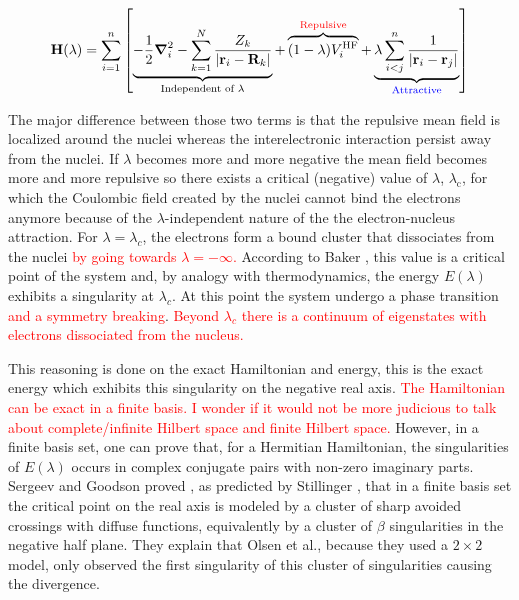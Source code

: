 \documentclass[11pt,a4paper]{article}
\newcommand{\titou}[1]{\textcolor{red}{#1}}
\newcommand{\bH}{\mathbf{H}}
\begin{document}
\begin{equation}\label{eq:HamiltonianStillinger}
    \bH(\lambda)=\sum\limits_{i=1}^{n}\left[ \underbrace{-\frac{1}{2}\grad_i^2 - \sum\limits_{k=1}^{N} \frac{Z_k}{|\vb{r}_i-\vb{R}_k|}}_{\text{Independent of $\lambda$}} + \overbrace{(1-\lambda)V_i^{\text{HF}}}^{\textcolor{red}{\text{Repulsive}}}+\underbrace{\lambda\sum\limits_{i<j}^{n}\frac{1}{|\vb{r}_i-\vb{r}_j|}}_{\textcolor{blue}{\text{Attractive}}}  \right]
\end{equation}

The major difference between those two terms is that the repulsive mean field is localized around the nuclei whereas the interelectronic interaction persist away from the nuclei. If $\lambda$ becomes more and more negative the mean field becomes more and more repulsive so there exists a critical (negative) value of $\lambda$, $\lambda_\text{c}$, for which the Coulombic field created by the nuclei cannot bind the electrons anymore because of the $\lambda$-independent nature of the the electron-nucleus attraction. For $\lambda = \lambda_c$, the electrons form a bound cluster that dissociates from the nuclei \titou{by going towards $\lambda = -\infty$.} According to Baker \cite{Baker_1971}, this value is a critical point of the system and, by analogy with thermodynamics, the energy $E(\lambda)$ exhibits a singularity at $\lambda_c$. At this point the system undergo a phase transition \titou{and a symmetry breaking}. \titou{Beyond $\lambda_c$ there is a continuum of eigenstates with electrons dissociated from the nucleus.}

This reasoning is done on the exact Hamiltonian and energy, this is the exact energy which exhibits this singularity on the negative real axis. 
\titou{The Hamiltonian can be exact in a finite basis. I wonder if it would not be more judicious to talk about complete/infinite Hilbert space and finite Hilbert space.}
However, in a finite basis set, one can prove that, for a Hermitian Hamiltonian, the singularities of $E(\lambda)$ occurs in complex conjugate pairs with non-zero imaginary parts. Sergeev and Goodson proved \cite{Sergeev_2005}, as predicted by Stillinger \cite{Stillinger_2000}, that in a finite basis set the critical point on the real axis is modeled by a cluster of sharp avoided crossings with diffuse functions, equivalently by a cluster of $\beta$ singularities in the negative half plane. They explain that Olsen et al., because they used a $2\times2$ model, only observed the first singularity of this cluster of singularities causing the divergence.
\end{document}
